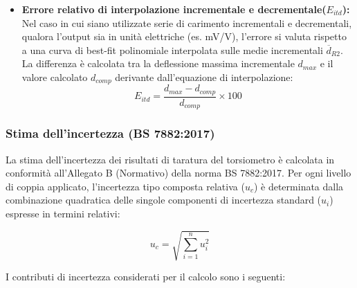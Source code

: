 \documentclass[a4paper, twoside]{article}
\begin{document}
\begin{itemize}
    \item \textbf{Errore relativo di interpolazione incrementale e decrementale($E_{itd}$):} Nel caso in cui siano utilizzate serie di carimento incrementali e decrementali, qualora l'output sia in unità elettriche (es. mV/V), l'errore si valuta rispetto a una curva di best-fit polinomiale interpolata sulle medie incrementali $\overline{d}_{R2}$. La differenza è calcolata tra la deflessione massima incrementale $d_{max}$ e il valore calcolato $d_{comp}$ derivante dall'equazione di interpolazione:
    \begin{equation}
        E_{itd} = \frac{d_{max} - d_{comp}}{d_{comp}} \times 100
    \end{equation}

\end{itemize}



\subsubsection{Stima dell'incertezza (BS 7882:2017)}

La stima dell'incertezza dei risultati di taratura del torsiometro è calcolata in conformità all'Allegato B (Normativo) della norma BS 7882:2017. Per ogni livello di coppia applicato, l'incertezza tipo composta relativa ($u_c$) è determinata dalla combinazione quadratica delle singole componenti di incertezza standard ($u_i$) espresse in termini relativi:

\begin{equation}
    u_c = \sqrt{\sum_{i=1}^{n} u_i^2}
\end{equation}

I contributi di incertezza considerati per il calcolo sono i seguenti:
\end{document}
